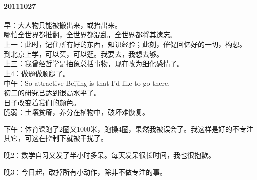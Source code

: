 \documentclass[UTF8]{book}
\begin{document}
\paragraph{20111027}
早：大人物只能被搬出来，或抬出来。\\
哪怕全世界都推翻，全世界都混乱，全世界都将其遗忘。\\

上一：此时，记住所有好的东西，知识经验；此刻，催促回忆好的一切，构想。\\
到北京上学，可以买，可以逛。我要去，我想去够。\\

上三：我曾经哲学是抽象总括事物，现在改为细化感情了。\\

上4：做题做顺腿了。\\

中午：So attractive Beijing is that I'd like to go there.\\
初二的研究已达到很高水平了。\\
日子改变着我们的颜色。\\
脆弱：土壤贫瘠，养分在植物中，破坏难恢复。

下午：体育课跑了2圈又1000米，跑操4圈，果然我被误会了。我这样是好的不专注其它，可这在控制下就被干扰了。

晚2：数学自习又发了半小时多呆。每天发呆很长时间，我也很抱歉。

晚3：今日起，改掉所有小动作，除非不做专注的事。
\end{document}
